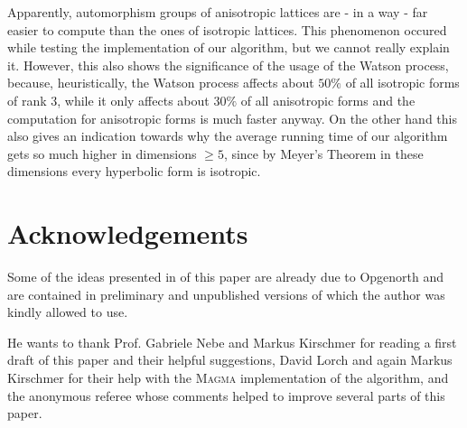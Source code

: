 \documentclass[10pt, preprint]{elsarticle}
\theoremstyle{definition}
\theoremstyle{definition}
\begin{document}
Apparently, automorphism groups of anisotropic lattices are - in a way - far easier to compute than the ones of isotropic lattices. This phenomenon occured  while testing the implementation of our algorithm, but we cannot really explain it. However, this also shows the significance of the usage of the Watson process, because, heuristically, the Watson process affects about $50\%$ of all isotropic forms of rank $3$, while it only affects about $30\%$ of all anisotropic forms and the computation for anisotropic forms is much faster anyway. On the other hand this also gives an indication towards why the average running time of our algorithm gets so much higher in dimensions $\geq 5$, since by Meyer's Theorem in these dimensions every hyperbolic form is isotropic.
\section*{Acknowledgements}
Some of the ideas presented in  of this paper are already due to Opgenorth and are contained in preliminary and unpublished versions of \cite{Opg01} which the author was kindly allowed to use. 

He wants to thank Prof. Gabriele Nebe and Markus Kirschmer for reading a first draft of this paper and their helpful suggestions, David Lorch and again Markus Kirschmer for their help with the \textsc{Magma} implementation of the algorithm, and the anonymous referee whose comments helped to improve several parts of this paper.
\end{document}

